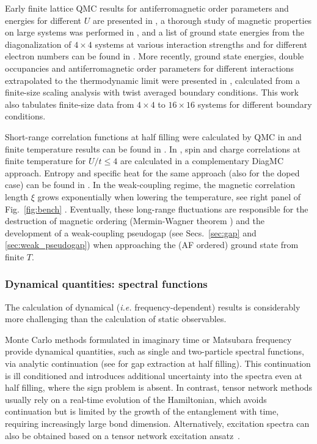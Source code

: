 \documentclass{ar-1col}
\begin{document}
Early finite lattice QMC results for antiferromagnetic order parameters and energies for different $U$ are presented in \cite{Hirsch89,White89}, a thorough study of magnetic properties on large systems was performed in \cite{Varney09}, and a list of ground state energies from the diagonalization of $4 \times 4$ systems at various interaction strengths and for different electron numbers can be found in \cite{Dagotto92}. More recently, ground state energies, double occupancies and
antiferromagnetic order parameters for different interactions extrapolated to the thermodynamic limit were presented in \cite{Qin16}, calculated from a finite-size scaling analysis with twist averaged boundary conditions. This work also tabulates finite-size data from $4 \times 4$ to $16 \times 16$ systems for different boundary conditions. 

Short-range correlation functions at half filling were calculated by QMC in \cite{Qin17} and finite temperature results can be found in \cite{Varney09}. In \cite{Kim20}, spin and charge correlations at finite temperature for $U/t\!\le\!4$ are calculated in a complementary DiagMC approach.
Entropy and specific heat for the same approach (also for the doped case) can be found in \cite{Lenihan21}. In the weak-coupling regime, the magnetic correlation length $\xi$ grows exponentially when lowering the temperature, see right panel of Fig.~\ref{fig:bench} \cite{Chakravarty88,White89,Moreo91,Schafer15,Rohringer16,Schaefer21A}. Eventually, these long-range fluctuations are responsible for the destruction of magnetic ordering (Mermin-Wagner theorem \cite{Mermin66}) and the development of a weak-coupling pseudogap (see Secs.~\ref{sec:gap} and \ref{sec:weak_pseudogap}) when approaching the (AF ordered) ground state from finite $T$.
\begin{marginnote}
\end{marginnote}

\subsubsection{Dynamical quantities: spectral functions}
The calculation of dynamical ({\it i.e.} frequency-dependent) results is considerably more challenging than the calculation of static observables. 

Monte Carlo methods formulated in imaginary time or Matsubara frequency provide dynamical quantities, such as single and two-particle spectral functions, via analytic continuation \cite{Jarrell96} (see \cite{Hirsch85} for gap extraction at half filling).
This continuation is ill conditioned and introduces additional uncertainty into the spectra even at half filling, where the sign problem is absent. In contrast, tensor network methods usually rely on a real-time evolution of the Hamiltonian, which avoids continuation but is limited by the growth of the entanglement with time, requiring increasingly large bond dimension. Alternatively, excitation spectra can also be obtained based on a tensor network excitation ansatz~\cite{Damme21}.
\end{document}
